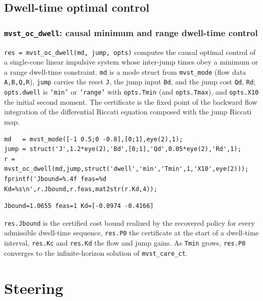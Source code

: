 \documentclass[11pt,oneside]{report}
\newcommand{\code}[1]{\texttt{#1}}
\begin{document}
\hypertarget{dwell-time-optimal-control}{%
\section{Dwell-time optimal control}\label{dwell-time-optimal-control}}

\hypertarget{mvst_oc_dwell-causal-minimum-and-range-dwell-time-control}{%
\subsection{\texorpdfstring{\code{mvst\_oc\_dwell}: causal minimum and range dwell-time control}{mvst\_oc\_dwell: causal minimum and range dwell-time control}}\label{mvst_oc_dwell-causal-minimum-and-range-dwell-time-control}}

\code{res = mvst\_oc\_dwell(md, jump, opts)} computes the causal optimal control of a
single-cone linear impulsive system whose inter-jump times obey a minimum or a
range dwell-time constraint. \code{md} is a mode struct from \code{mvst\_mode} (flow data
\code{A,B,Q,R}), \code{jump} carries the reset \code{J}, the jump input \code{Bd}, and the jump cost
\code{Qd}, \code{Rd}; \code{opts.dwell} is \code{'min'} or \code{'range'} with \code{opts.Tmin} (and
\code{opts.Tmax}), and \code{opts.X10} the initial second moment. The certificate is the
fixed point of the backward flow integration of the differential Riccati
equation composed with the jump Riccati map.

\begin{lstlisting}[style=matlabstyle]
md   = mvst_mode([-1 0.5;0 -0.8],[0;1],eye(2),1);
jump = struct('J',1.2*eye(2),'Bd',[0;1],'Qd',0.05*eye(2),'Rd',1);
r = mvst_oc_dwell(md,jump,struct('dwell','min','Tmin',1,'X10',eye(2)));
fprintf('Jbound=%.4f feas=%d Kd=%s\n',r.Jbound,r.feas,mat2str(r.Kd,4));
\end{lstlisting}

\begin{lstlisting}[style=outputstyle]
Jbound=1.0655 feas=1 Kd=[-0.0974 -0.4166]
\end{lstlisting}

\code{res.Jbound} is the certified cost bound realized by the recovered policy for
every admissible dwell-time sequence, \code{res.P0} the certificate at the start of a
dwell-time interval, \code{res.Kc} and \code{res.Kd} the flow and jump gains. As \code{Tmin} grows,
\code{res.P0} converges to the infinite-horizon solution of \code{mvst\_care\_ct}.


\hypertarget{chap:06-steering}{%
\chapter{Steering}\label{chap:06-steering}}
\end{document}
